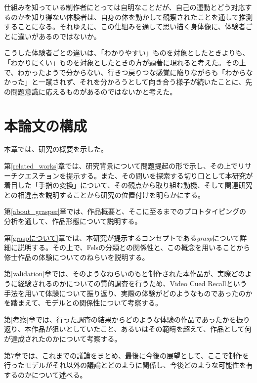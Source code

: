 仕組みを知っている制作者にとっては自明なことだが、自己の運動とどう対応するのかを知り得ない体験者は、自身の体を動かして観察されたことを通して推測することになる。それゆえに、この仕組みを通して思い描く身体像に、体験者ごとに違いがあるのではないか。

こうした体験者ごとの違いは、「わかりやすい」ものを対象としたときよりも、「わかりにくい」ものを対象としたときの方が顕著に現れると考えた。その上で、わかったようで分からない、行きつ戻りつな感覚に陥りながらも「わからなかった」と一蹴されず、それを分かろうとして向き合う様子が続いたことに、先の問題意識に応えるものがあるのではないかと考えた。

\section{本論文の構成}
本章では、研究の概要を示した。

第\ref{related_works}章では、研究背景について問題提起の形で示し、その上でリサーチクエスチョンを提示する。また、その問いを探索する切り口として本研究が着目した「手指の変換」について、その観点から取り組む動機、そして関連研究との相違点を説明することから研究の位置付けを明らかにする。

第\ref{about_grasper}章では、作品概要と、そこに至るまでのプロトタイピングの分析を通して、作品形態について説明する。

第\ref{graspについて}章では、本研究が提示するコンセプトである\textit{grasp}について詳細に説明する。その上で、Felsの分類との関係性と、この概念を用いることから修士作品の体験についてのねらいを説明する。

第\ref{validation}章では、そのようなねらいのもと制作された本作品が、実際どのように経験されるのかについての質的調査を行うため、Video Cued Recallという手法を用いて体験について振り返り、実際の体験がどのようなものであったのかを踏まえて、モデルとの関係性について考察する。

第\ref{考察}章では、行った調査の結果からどのような体験の作品であったかを振り返り、本作品が狙いとしていたこと、あるいはその範疇を超えて、作品として何が達成されたのかについて考察する。

第7章では、これまでの議論をまとめ、最後に今後の展望として、ここで制作を行ったモデルがそれ以外の議論とどのように関係し、今後どのような可能性を有するのかについて述べる。